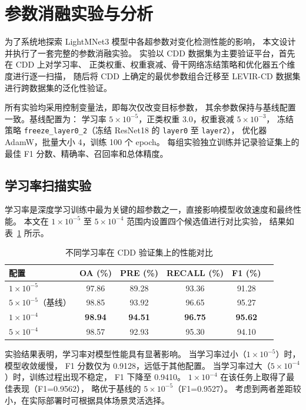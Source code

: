 \documentclass[UTF8]{ctexart}
\begin{document}

\section{参数消融实验与分析}

为了系统地探索 LightMNet3 模型中各超参数对变化检测性能的影响，
本文设计并执行了一套完整的参数消融实验。
实验以 CDD 数据集为主要验证平台，首先在 CDD 上对学习率、
正类权重、权重衰减、骨干网络冻结策略和优化器五个维度进行逐一扫描，
随后将 CDD 上确定的最优参数组合迁移至 LEVIR-CD 数据集进行跨数据集的泛化性验证。

所有实验均采用控制变量法，即每次仅改变目标参数，
其余参数保持与基线配置一致。基线配置为：
学习率 $5\times10^{-5}$，正类权重 $3.0$，权重衰减 $5\times10^{-3}$，
冻结策略 \texttt{freeze\_layer0\_2}（冻结 ResNet18 的 \texttt{layer0} 至 \texttt{layer2}），
优化器 AdamW，批量大小 4，训练 100 个 epoch。
每组实验独立训练并记录验证集上的最佳 F1 分数、精确率、召回率和总体精度。

\subsection{学习率扫描实验}

学习率是深度学习训练中最为关键的超参数之一，直接影响模型收敛速度和最终性能。
本文在 $1\times10^{-5}$ 至 $5\times10^{-4}$ 范围内设置四个候选值进行对比实验，
结果如表~\ref{tab:lr_scan} 所示。

\begin{table}[htbp]
\centering
\caption{不同学习率在 CDD 验证集上的性能对比}
\label{tab:lr_scan}
\begin{tabular}{lccccc}
\hline
配置 & OA (\%) & PRE (\%) & RECALL (\%) & F1 (\%) \\
\hline
$1\times10^{-5}$ & 97.86 & 89.28 & 93.36 & 91.28 \\
$5\times10^{-5}$（基线） & 98.85 & 93.92 & 96.65 & 95.27 \\
$1\times10^{-4}$ & \textbf{98.94} & \textbf{94.51} & \textbf{96.75} & \textbf{95.62} \\
$5\times10^{-4}$ & 98.57 & 92.93 & 95.30 & 94.10 \\
\hline
\end{tabular}
\end{table}

实验结果表明，学习率对模型性能具有显著影响。
当学习率过小（$1\times10^{-5}$）时，模型收敛缓慢，
F1 分数仅为 0.9128，远低于其他配置。
当学习率过大（$5\times10^{-4}$）时，训练过程出现不稳定，
F1 下降至 0.9410。
$1\times10^{-4}$ 在该任务上取得了最佳表现（F1=0.9562），
略优于基线的 $5\times10^{-5}$（F1=0.9527）。
考虑到两者差距较小，在实际部署时可根据具体场景灵活选择。
\end{document}
